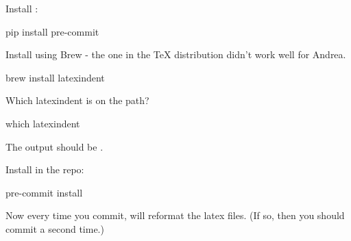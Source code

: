 Install :
%
\begin{console}
    pip install pre-commit
\end{console}
%

Install  using Brew - the one in the TeX distribution didn't work well for Andrea.
%
\begin{console}
    brew install latexindent
\end{console}
%
Which latexindent is on the path?
%
\begin{console}
    which latexindent
\end{console}
%
The output should be .

Install  in the repo:
%
\begin{console}
    pre-commit install
\end{console}
%
Now every time you commit,  will reformat the latex files.
(If so, then you should commit a second time.)
